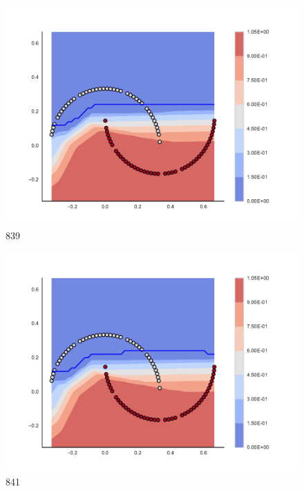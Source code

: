 \begin{subfigure}[b]{0.09\textwidth}
    \includegraphics[clip, trim=2.35cm 1.75cm 4.5cm 0cm,width=\textwidth]{img/convergence/839.pdf}
    \caption{839}
    \label{fig:convergence_839}
\end{subfigure}
%
\begin{subfigure}[b]{0.09\textwidth}
    \includegraphics[clip, trim=2.35cm 1.75cm 4.5cm 0cm,width=\textwidth]{img/convergence/841.pdf}
    \caption{841}
    \label{fig:convergence_841}
\end{subfigure}
%

